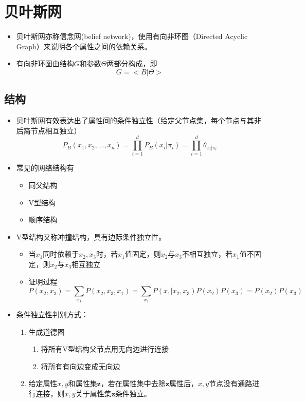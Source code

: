 \section{贝叶斯网}

\begin{itemize}
\item 贝叶斯网亦称信念网(belief network)，使用有向非环图（Directed Acyclic Graph）来说明各个属性之间的依赖关系。
\item 有向非环图由结构$G$和参数$\mathcal{\Theta}$两部分构成，即
\begin{equation}
G=<B|\Theta>
\end{equation}
\end{itemize}

\subsection{结构}

\begin{itemize}
\item 贝叶斯网有效表达出了属性间的条件独立性（给定父节点集，每个节点与其非后裔节点相互独立）
\begin{equation}
P_B(x_1,x_2,\dots,x_n)=\prod_{i=1}^{d}P_B(x_i|\pi_i)=\prod_{i=1}^d\theta_{x_i|\pi_i}
\end{equation}
\item 常见的网络结构有
    \begin{itemize}
    \item 同父结构
    \item V型结构
    \item 顺序结构
    \end{itemize}
\item V型结构又称冲撞结构，具有边际条件独立性。
    \begin{itemize}
    \item 当$x_1$同时依赖于$x_2,x_3$时，若$x_1$值固定，则$x_2$与$x_3$不相互独立，若$x_1$值不固定，则$x_2$与$x_3$相互独立
    \item 证明过程\begin{equation}P(x_2,x_3)=\sum_{x_1}P(x_2,x_3,x_1)=\sum_{x_1}P(x_1|x_2,x_3)P(x_2)P(x_3)=P(x_2)P(x_3)\end{equation}
    \end{itemize}
\item 条件独立性判别方式：
    \begin{enumerate}
    \item 生成道德图
        \begin{enumerate}
        \item 将所有V型结构父节点用无向边进行连接
        \item 将所有有向边变成无向边
        \end{enumerate}
    \item 给定属性$x,y$和属性集$\mathbf{z}$，若在属性集中去除$\mathbf{z}$属性后，$x,y$节点没有通路进行连接，则$x,y$关于属性集$\mathbf{z}$条件独立。
    \end{enumerate}
\end{itemize}

